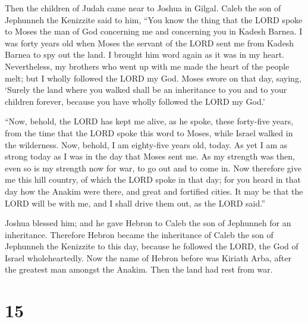 Then the children of Judah came near to Joshua in Gilgal.
Caleb the son of Jephunneh the Kenizzite said to him, ``You know the
thing that the LORD spoke to Moses the man of God concerning me and
concerning you in Kadesh Barnea.  I was forty years old when
Moses the servant of the LORD sent me from Kadesh Barnea to spy out the
land. I brought him word again as it was in my heart. 
Nevertheless, my brothers who went up with me made the heart of the
people melt; but I wholly followed the LORD my God.  Moses
swore on that day, saying, `Surely the land where you walked shall be an
inheritance to you and to your children forever, because you have wholly
followed the LORD my God.'

 ``Now, behold, the LORD has kept me alive, as he spoke,
these forty-five years, from the time that the LORD spoke this word to
Moses, while Israel walked in the wilderness. Now, behold, I am
eighty-five years old, today.  As yet I am as strong today
as I was in the day that Moses sent me. As my strength was then, even so
is my strength now for war, to go out and to come in.  Now
therefore give me this hill country, of which the LORD spoke in that
day; for you heard in that day how the Anakim were there, and great and
fortified cities. It may be that the LORD will be with me, and I shall
drive them out, as the LORD said.''

 Joshua blessed him; and he gave Hebron to Caleb the son of
Jephunneh for an inheritance.  Therefore Hebron became the
inheritance of Caleb the son of Jephunneh the Kenizzite to this day,
because he followed the LORD, the God of Israel wholeheartedly.
 Now the name of Hebron before was Kiriath Arba, after the
greatest man amongst the Anakim. Then the land had rest from war.

\hypertarget{section-14}{%
\section{15}\label{section-14}}

